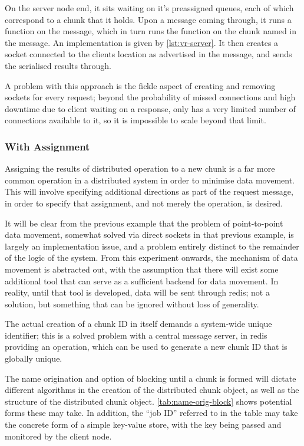 On the server node end, it sits waiting on it's preassigned queues, each of
which correspond to a chunk that it holds. 
Upon a message coming through, it runs a  function on the
message, which in turn runs the function on the chunk named in the message. 
An implementation is given by \cref{lst:vr-server}.
It then creates a socket connected to the clients location as advertised in
the message, and sends the serialised results through.

A problem with this approach is the fickle aspect of creating and removing
sockets for every request; beyond the probability of missed connections and
high downtime due to client waiting on a response, \R only has a very limited
number of connections available to it, so it is impossible to scale beyond that
limit.

\subsubsection{With Assignment}

Assigning the results of distributed operation to a new chunk is a far more
common operation in a distributed system in order to minimise data movement.
This will involve specifying additional directions as part of the request
message, in order to specify that assignment, and not merely the operation, is
desired.

It will be clear from the previous example that the problem of point-to-point
data movement, somewhat solved via direct sockets in that previous example, is
largely an implementation issue, and a problem entirely distinct to the
remainder of the logic of the system.
From this experiment onwards, the mechanism of data movement is abstracted out,
with the assumption that there will exist some additional tool that can serve
as a sufficient backend for data movement.
In reality, until that tool is developed, data will be sent through redis; not
a solution, but something that can be ignored without loss of generality.

The actual creation of a chunk ID in itself demands a system-wide unique
identifier; this is a solved problem with a central message server, in redis
providing an  operation, which can be used to generate a new chunk
ID that is globally unique.

The name origination and option of blocking until a chunk is formed will
dictate different algorithms in the creation of the distributed chunk object,
as well as the structure of the distributed chunk object.
\cref{tab:name-orig-block} shows potential forms these may take.
In addition, the ``job ID'' referred to in the table may
take the concrete form of a simple key-value store, with the key being passed
and monitored by the client node.

